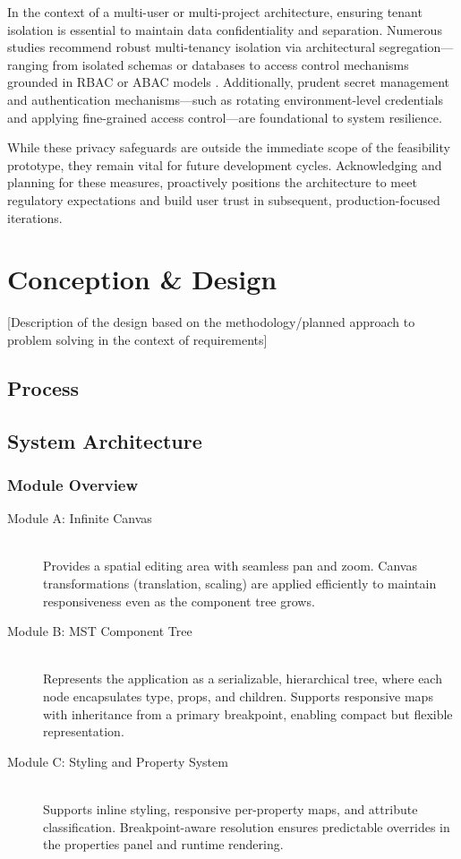 \documentclass[oneside,12pt]{book}
\begin{document}
In the context of a multi-user or multi-project architecture, ensuring tenant isolation is essential to maintain data confidentiality and separation. Numerous studies recommend robust multi-tenancy isolation via architectural segregation—ranging from isolated schemas or databases to access control mechanisms grounded in RBAC or ABAC models \cite{chippagiri2025multiTenantSecurity, das2019multiTenantIsolation}. Additionally, prudent secret management and authentication mechanisms—such as rotating environment-level credentials and applying fine-grained access control—are foundational to system resilience.

While these privacy safeguards are outside the immediate scope of the feasibility prototype, they remain vital for future development cycles. Acknowledging and planning for these measures, proactively positions the architecture to meet regulatory expectations and build user trust in subsequent, production-focused iterations.

\chapter{Conception \& Design}
[Description of the design based on the methodology/planned approach to problem solving in the context of requirements]

\section{Process}

\section{System Architecture}

\subsection{Module Overview}

\begin{description}
    \item[Module A: Infinite Canvas] \hfill \\
    Provides a spatial editing area with seamless pan and zoom. Canvas transformations (translation, scaling) are applied efficiently to maintain responsiveness even as the component tree grows.
    \item[Module B: MST Component Tree] \hfill \\
    Represents the application as a serializable, hierarchical tree, where each node encapsulates type, props, and children. Supports responsive maps with inheritance from a primary breakpoint, enabling compact but flexible representation.
    \item[Module C: Styling and Property System] \hfill \\
    Supports inline styling, responsive per-property maps, and attribute classification. Breakpoint-aware resolution ensures predictable overrides in the properties panel and runtime rendering.
\end{description}
\end{document}
